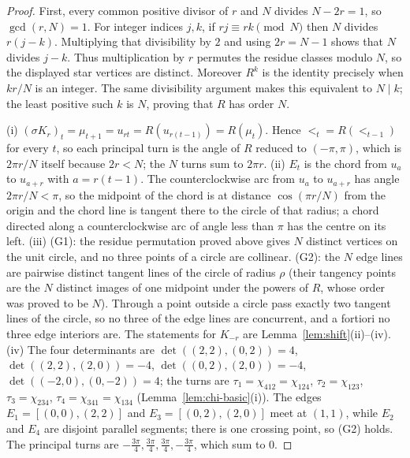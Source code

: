 \begin{proof}\leanok{}
First, every common positive divisor of $r$ and $N$ divides
$N-2r=1$, so $\gcd(r,N)=1$.
For integer indices $j,k$, if $rj\equiv rk\pmod N$ then
$N$ divides $r(j-k)$. Multiplying that divisibility by $2$ and
using $2r=N-1$ shows that $N$ divides $j-k$.
Thus multiplication by $r$ permutes the residue classes modulo $N$,
so the displayed star vertices are distinct.
Moreover $R^k$ is the identity precisely when $kr/N$ is an integer.
The same divisibility argument makes this equivalent to $N\mid k$;
the least positive such $k$ is $N$, proving that $R$ has order $N$.

(i) $(\sigma K_r)_t=\mu_{t+1}=u_{rt}=R(u_{r(t-1)})=R(\mu_t)$. Hence
$\lt_t=R(\lt_{t-1})$ for every $t$, so each principal turn is the angle of
$R$ reduced to $(-\pi,\pi)$, which is $2\pi r/N$ itself because $2r<N$; the
$N$ turns sum to $2\pi r$. (ii) $E_t$ is the chord from $u_a$ to $u_{a+r}$
with $a=r(t-1)$. The counterclockwise arc from $u_a$ to $u_{a+r}$ has angle
$2\pi r/N<\pi$, so the midpoint of the chord is at distance $\cos(\pi r/N)$
from the origin and the chord line is tangent there to the circle of that
radius; a chord directed along a counterclockwise arc of angle less than
$\pi$ has the centre on its left. (iii) (G1): the residue permutation proved above gives $N$ distinct
vertices on the unit circle, and no three points of a circle are collinear.
(G2): the $N$ edge lines are pairwise distinct tangent lines of the circle of
radius $\rho$ (their tangency points are the $N$ distinct images of one
midpoint under the powers of $R$, whose order was proved to be $N$). Through a point
outside a circle pass exactly two tangent lines of the circle, so no three of
the edge lines are concurrent, and a fortiori no three edge interiors are.
The statements for $K_{-r}$ are Lemma~\ref{lem:shift}(ii)--(iv). (iv) The
four determinants are $\det((2,2),(0,2))=4$, $\det((2,2),(2,0))=-4$,
$\det((0,2),(2,0))=-4$, $\det((-2,0),(0,-2))=4$; the turns are
$\tau_1=\chi_{412}=\chi_{124}$, $\tau_2=\chi_{123}$, $\tau_3=\chi_{234}$,
$\tau_4=\chi_{341}=\chi_{134}$ (Lemma~\ref{lem:chi-basic}(i)). The edges
$E_1=[(0,0),(2,2)]$ and $E_3=[(0,2),(2,0)]$ meet at $(1,1)$, while $E_2$ and
$E_4$ are disjoint parallel segments; there is one crossing point, so (G2)
holds. The principal turns are $-\frac{3\pi}4,\frac{3\pi}4,\frac{3\pi}4,-\frac{3\pi}4$,
which sum to $0$.
\end{proof}

